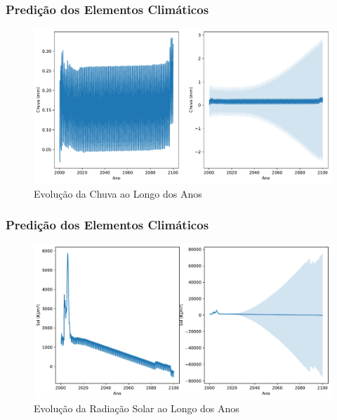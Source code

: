 \documentclass{beamer}
\begin{document}
\begin{frame}
\frametitle{Predição dos Elementos Climáticos}
\begin{figure}
    \centering
    \includegraphics[width=0.9\linewidth]{chuva.pdf}
    \caption{Evolução da Chuva ao Longo dos Anos}
\end{figure}
\end{frame}


\begin{frame}
\frametitle{Predição dos Elementos Climáticos}
\begin{figure}
    \centering
    \includegraphics[width=0.9\linewidth]{sol.pdf}
    \caption{Evolução da Radiação Solar ao Longo dos Anos}
\end{figure}
\end{frame}
\end{document}
